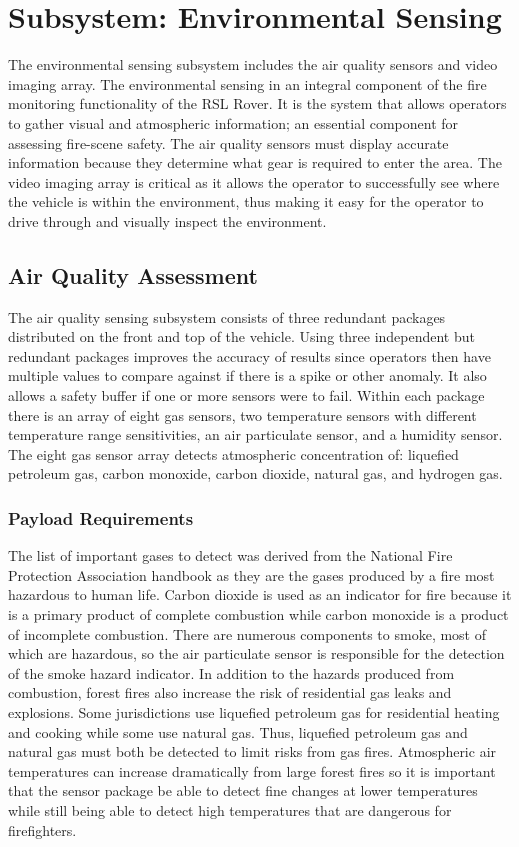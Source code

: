 \chapter{Subsystem: Environmental Sensing}

The environmental sensing subsystem includes the air quality sensors and video imaging array. The environmental sensing in an integral component of the fire monitoring functionality of the RSL Rover. It is the system that allows operators to gather visual and atmospheric information; an essential component for assessing fire-scene safety. The air quality sensors must display accurate information because they determine what gear is required to enter the area. The video imaging array is critical as it allows the operator to successfully see where the vehicle is within the environment, thus making it easy for the operator to drive through and visually inspect the environment. 

\section{Air Quality Assessment}

The air quality sensing subsystem consists of three redundant packages distributed on the front and top of the vehicle. Using three independent but redundant packages improves the accuracy of results since operators then have multiple values to compare against if there is a spike or other anomaly. It also allows a safety buffer if one or more sensors were to fail. Within each package there is an array of eight gas sensors, two temperature sensors with different temperature range sensitivities, an air particulate sensor, and a humidity sensor. The eight gas sensor array detects atmospheric concentration of: liquefied petroleum gas, carbon monoxide, carbon dioxide, natural gas, and hydrogen gas.

\subsection{Payload Requirements}

The list of important gases to detect was derived from the National Fire Protection Association handbook as they are the gases produced by a fire most hazardous to human life. Carbon dioxide is used as an indicator for fire because it is a primary product of complete combustion while carbon monoxide is a product of incomplete combustion. There are numerous components to smoke, most of which are hazardous, so the air particulate sensor is responsible for the detection of the smoke hazard indicator. In addition to the hazards produced from combustion, forest fires also increase the risk of residential gas leaks and explosions. Some jurisdictions use liquefied petroleum gas for residential heating and cooking while some use natural gas. Thus, liquefied petroleum gas and natural gas must both be detected to limit risks from gas fires. Atmospheric air temperatures can increase dramatically from large forest fires so it is important that the sensor package be able to detect fine changes at lower temperatures while still being able to detect high temperatures that are dangerous for firefighters. 

